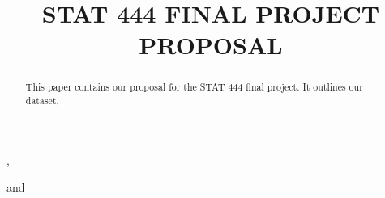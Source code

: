 \documentclass[aoas]{imsart}
\numberwithin{equation}{section}
\theoremstyle{plain}
\theoremstyle{remark}
\begin{document}
\begin{frontmatter}
\title{STAT 444 FINAL PROJECT PROPOSAL}
\runtitle{}



\begin{aug}


\author[A]{ 
  }
  ,
\author[A]{ 
  }
  
\author[A]{ 
  }
  and
\author[A]{ 
  }
  

\address[A]{Department of Statistics and Actuarial Science, University
of Waterloo,
  }
\end{aug}

\begin{abstract}
This paper contains our proposal for the STAT 444 final project. It
outlines our dataset,
\end{abstract}


\begin{keyword}
\end{keyword}

\end{frontmatter}
\end{document}
